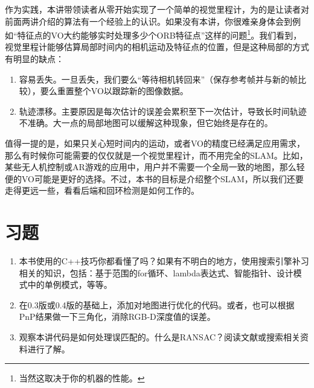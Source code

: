 作为实践，本讲带领读者从零开始实现了一个简单的视觉里程计，为的是让读者对前面两讲介绍的算法有一个经验上的认识。如果没有本讲，你很难亲身体会到例如“特征点的VO大约能够实时处理多少个ORB特征点”这样的问题\footnote{当然这取决于你的机器的性能。}。我们看到，视觉里程计能够估算局部时间内的相机运动及特征点的位置，但是这种局部的方式有明显的缺点：

\begin{enumerate}
	\item 容易丢失。一旦丢失，我们要么“等待相机转回来”（保存参考帧并与新的帧比较），要么重置整个VO以跟踪新的图像数据。
	\item 轨迹漂移。主要原因是每次估计的误差会累积至下一次估计，导致长时间轨迹不准确。大一点的局部地图可以缓解这种现象，但它始终是存在的。
\end{enumerate}

值得一提的是，如果只关心短时间内的运动，或者VO的精度已经满足应用需求，那么有时候你可能需要的仅仅就是一个视觉里程计，而不用完全的SLAM。比如，某些无人机控制或AR游戏的应用中，用户并不需要一个全局一致的地图，那么轻便的VO可能是更好的选择。不过，本书的目标是介绍整个SLAM，所以我们还要走得更远一些，看看后端和回环检测是如何工作的。

\section*{习题}
\begin{enumerate}
	\item 本书使用的C++技巧你都看懂了吗？如果有不明白的地方，使用搜索引擎补习相关的知识，包括：基于范围的for循环、lambda表达式、智能指针、设计模式中的单例模式，等等。
	\item 在0.3版或0.4版的基础上，添加对地图进行优化的代码。或者，也可以根据PnP结果做一下三角化，消除RGB-D深度值的误差。
	\item 观察本讲代码是如何处理误匹配的。什么是RANSAC？阅读文献\cite{wiki:RANSAC}或搜索相关资料进行了解。
\end{enumerate}
